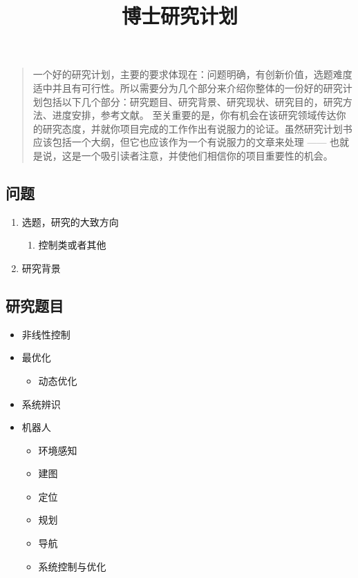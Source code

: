 \documentclass[
]{article}
\title{博士研究计划}
\author{}
\date{}
\providecommand{\tightlist}{%
  \setlength{\itemsep}{0pt}\setlength{\parskip}{0pt}}
\begin{document}
\maketitle

\begin{quote}
一个好的研究计划，主要的要求体现在：问题明确，有创新价值，选题难度适中并且有可行性。所以需要分为几个部分来介绍你整体的一份好的研究计划包括以下几个部分：研究题目、研究背景、研究现状、研究目的，研究方法、进度安排，参考文献。
至关重要的是，你有机会在该研究领域传达你的研究态度，并就你项目完成的工作作出有说服力的论证。虽然研究计划书应该包括一个大纲，但它也应该作为一个有说服力的文章来处理
------
也就是说，这是一个吸引读者注意，并使他们相信你的项目重要性的机会。
\end{quote}

\subsection{问题}\label{ux95eeux9898}

\begin{enumerate}
\tightlist
\item
  选题，研究的大致方向

  \begin{enumerate}
  \tightlist
  \item
    控制类或者其他
  \end{enumerate}
\item
  研究背景
\end{enumerate}

\subsection{研究题目}\label{ux7814ux7a76ux9898ux76ee}

\begin{itemize}
\tightlist
\item
  非线性控制
\item
  最优化

  \begin{itemize}
  \tightlist
  \item
    动态优化
  \end{itemize}
\item
  系统辨识
\item
  机器人

  \begin{itemize}
  \tightlist
  \item
    环境感知
  \item
    建图
  \item
    定位
  \item
    规划
  \item
    导航
  \item
    系统控制与优化
  \end{itemize}
\end{itemize}
\end{document}
